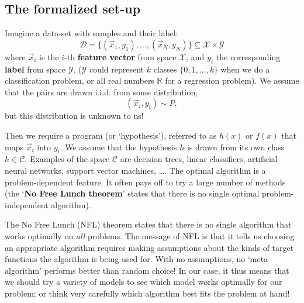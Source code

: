 \documentclass{article}
\begin{document}
\subsection{The formalized set-up}
Imagine a data-set with samples and their label:
\begin{equation}
    \mathcal{D} = \Bigg\{ (\vec{x}_1,y_1), \dots, (\vec{x}_N,y_N) \Bigg\} \subseteq \mathcal{X}\times\mathcal{Y}
\end{equation}
where $\vec{x}_i$ is the $i$-th \textbf{feature vector} from space $\mathcal{X}$, and $y_i$ the corresponding \textbf{label} from space $\mathcal{Y}$. ($\mathcal{Y}$ could represent $k$ classes $\{0,1,\dots,k\}$ when we do a classification problem, or all real numbers $\mathbb{R}$ for a regression problem). We assume that the pairs are drawn i.i.d. from some distribution,
\begin{equation}
    (\vec{x}_i,y_i) \sim P,
\end{equation}
but this distribution is unknown to us!

Then we require a program (or `hypothesis'), referred to as $h(x)$ or $f(x)$ that maps $\vec{x}_i$ into $y_i$. We assume that the hypothesis $h$ is drawn from its own class $h\in\mathcal{C}$. Examples of the space $\mathcal{C}$ are decision trees, linear classifiers, artificial neural networks, support vector machines, \dots. The optimal algorithm is a problem-dependent feature. It often pays off to try a large number of methods (the `\textbf{No Free Lunch theorem}' states that there is no single optimal problem-independent algorithm).
\begin{spexample}
    The No Free Lunch (NFL) theorem states that there is no single algorithm that works optimally on \textit{all} problems. The message of NFL is that it tells us choosing an appropriate algorithm requires making assumptions about the kinds of target functions the algorithm is being used for. With no assumptions, no `meta-algorithm' performs better than random choice! In our case, it thus means that we should try a variety of models to see which model works optimally for our problem; or think very carefully which algorithm best fits the problem at hand!
\end{spexample}
\end{document}
